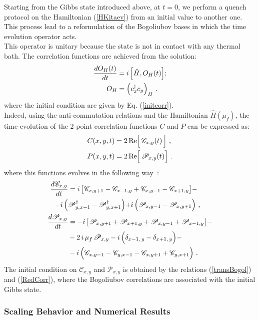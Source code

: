 \documentclass[pra,twocolumn,preprintnumbers,amsmath,amssymb,nofootinbib,floatfix,longbibliography]{revtex4}
\begin{document}
Starting from the Gibbs state introduced above, at $t=0$,
 we perform a quench protocol on the Hamiltonian
(\ref{HKitaev}) from an
initial value to another one. This process lead to a
reformulation of the Bogoliubov bases in which the time
evolution operator acts. \\
This operator is unitary because the state is not in
contact with any thermal bath. The correlation functions
are achieved from the solution:
\begin{align}
   \label{EQUnitary}
   \frac{d O_{H}(t) }{d t}  &= i\,\Bigr[\hat H,
      O_{H}(t) \Bigr] ;\\
    O_H &= \Bigl(c^\dagger_x c_y\Bigl)_H\,\,.
\end{align}
where the initial condition are given by Eq.
(\ref{initcorr}).\\
Indeed, using the anti-commutation relations and the
Hamiltonian $\hat H(\mu_f)$, the time-evolution of the
2-point correlation functions $C$ and $P$ can be expressed
as:
\begin{align}
C(x,y,t) & =  2\,{\rm Re}\Bigr[
\,{\mathscr{C}_{x,y}}(t) \,\Bigr]        \,\,, \\
P(x,y,t) & = 2\,{\rm Re}\Bigr[
\,{\mathscr{P}_{x,y}}(t) \Bigr]   \,\,.
\end{align}
where this functions evolves in the following
way~\cite{TV21}:
\begin{align}
\frac{d\mathscr{C}_{x,y}}{dt}& =
i\,\bigr[\mathscr{C}_{x,y+1} - \mathscr{C}_{x-1,y} +
\mathscr{C}_{x,y-1} - \mathscr{C}_{x+1,y} \bigr] - \notag\\
-i\, \Bigl(& \mathscr{P}_{y,x-1}^\dagger -
\mathscr{P}_{y,x+1}^\dagger \Bigl)  + i\, \Bigl(
\mathscr{P}_{x,y-1} - \mathscr{P}_{x,y+1} \Bigl) \,\,, \\
\frac{d\mathscr{P}_{x,y}}{dt} &=
-i\,\bigr[\mathscr{P}_{x,y+1} + \mathscr{P}_{x+1,y}+
\mathscr{P}_{x,y-1} + \mathscr{P}_{x-1,y} \bigr] - \notag\\
&- 2\,i\,\mu_f  \,\mathscr{P}_{x,y}-i\,\Bigl(
\delta _{x-1,\,y} - \delta _{x+1,\,y} \Bigl) - \notag \\
 &- i\, \Bigl( \mathscr{C}_{x,y-1} -
\mathscr{C}_{y,x-1} - \mathscr{C}_{x,y+1}
+ \mathscr{C}_{y,x+1} \Bigl) \,\,.
\end{align}
The initial condition on $\mathscr{C}_{x,y}$ and
$\mathscr{P}_{x,y}$ is obtained by the relations
(\ref{transBogol}) and (\ref{RedCorr}), where the
Bogoliubov correlations are associated with the initial
Gibbs state.


\subsubsection{Scaling Behavior and Numerical Results}
\end{document}
